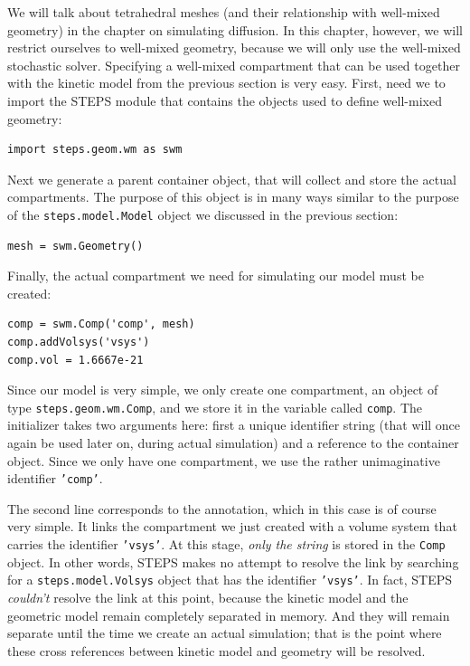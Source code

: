 \documentclass[a4paper,12pt]{book}
\begin{document}
We will talk about tetrahedral meshes (and their relationship with well-mixed geometry) in the chapter on simulating diffusion. In this chapter, however, we will restrict ourselves to well-mixed geometry, because we will only use the well-mixed stochastic solver. Specifying a well-mixed compartment that can be used together with the kinetic model from the previous section is very easy. First, need we to import the STEPS module that contains the objects used to define well-mixed geometry:

\begin{verbatim}
import steps.geom.wm as swm
\end{verbatim}

Next we generate a parent container object, that will collect and store the actual compartments. The purpose of this object is in many ways similar to the purpose of the \texttt{steps.model.Model} object we discussed in the previous section:
\begin{verbatim}
mesh = swm.Geometry()
\end{verbatim}

Finally, the actual compartment we need for simulating our model must be created:

\begin{verbatim}
comp = swm.Comp('comp', mesh)
comp.addVolsys('vsys')
comp.vol = 1.6667e-21
\end{verbatim}

Since our model is very simple, we only create one compartment, an object of type \texttt{steps.geom.wm.Comp}, and we store it in the variable called \texttt{comp}. The initializer takes two arguments here: first a unique identifier string (that will once again be used later on, during actual simulation) and a reference to the container object. Since we only have one compartment, we use the rather unimaginative identifier \texttt{'comp'}.

The second line corresponds to the annotation, which in this case is of course very simple. It links the compartment we just created with a volume system that carries the identifier \texttt{'vsys'}. At this stage, \emph{only the string} is stored in the \texttt{Comp} object. In other words, STEPS makes no attempt to resolve the link by searching for a \texttt{steps.model.Volsys} object that has the identifier \texttt{'vsys'}. In fact, STEPS \emph{couldn't} resolve the link at this point, because the kinetic model and the geometric model remain completely separated in memory. And they will remain separate until the time we create an actual simulation; that is the point where these cross references between kinetic model and geometry will be resolved. 
\end{document}
